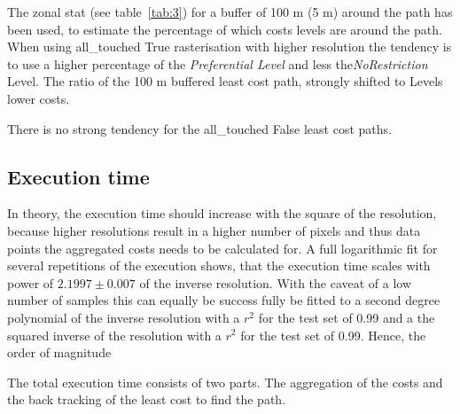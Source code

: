 The zonal stat (see table~\ref{tab:3}) for a buffer of 100 m (5 m) around the path has been used, to estimate the
percentage of which costs levels are around the path.
When using all\_touched True rasterisation with higher resolution the tendency is to use a higher percentage of the
\textit{Preferential Level} and less the\textit{NoRestriction} Level.
The ratio of the 100 m buffered least cost path, strongly shifted  to Levels lower costs.

There is no strong tendency for the all\_touched False least cost paths.

\subsection{Execution time}\label{subsec:execution-time}

In theory, the execution time should increase with the square of the resolution, because higher resolutions result in a higher number of pixels and thus data points the aggregated costs needs to be calculated for. 
A full logarithmic fit for several repetitions of the execution shows, that the execution time scales with power of $2.1997  \pm 0.007$ of the inverse resolution. 
With the caveat of a low number of samples this can equally be success fully be fitted to a second degree polynomial of the inverse resolution with a $r^2$ for the test set of 0.99 and a the squared inverse of the resolution with a $r^2$ for the test set of 0.99.
Hence, the order of magnitude

The total execution time consists of two parts. 
The aggregation of the costs and the back tracking of the least cost to find the path.

\setlength{\tabcolsep}{10pt}

